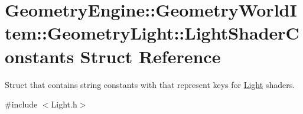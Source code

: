 \hypertarget{struct_geometry_engine_1_1_geometry_world_item_1_1_geometry_light_1_1_light_shader_constants}{}\section{Geometry\+Engine\+::Geometry\+World\+Item\+::Geometry\+Light\+::Light\+Shader\+Constants Struct Reference}
\label{struct_geometry_engine_1_1_geometry_world_item_1_1_geometry_light_1_1_light_shader_constants}


Struct that contains string constants with that represent keys for \mbox{\hyperlink{class_geometry_engine_1_1_geometry_world_item_1_1_geometry_light_1_1_light}{Light}} shaders.  




{\ttfamily \#include $<$Light.\+h$>$}

